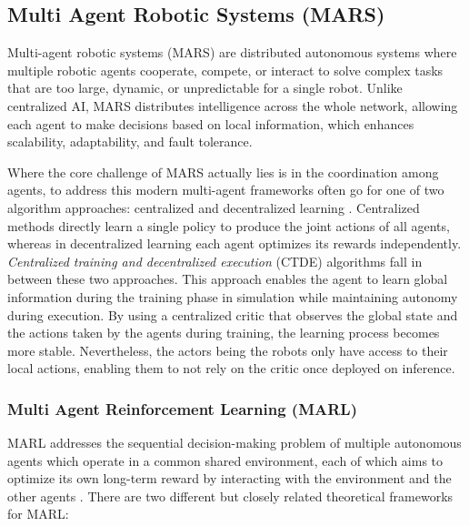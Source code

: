 \subsection{Multi Agent Robotic Systems (MARS)}
Multi-agent robotic systems (MARS) are distributed autonomous systems where multiple robotic agents cooperate, compete, or interact to solve complex tasks that are too large, dynamic, or unpredictable for a single robot.  Unlike centralized AI, MARS distributes intelligence across the whole network, allowing each agent to make decisions based on local information, which enhances scalability, adaptability, and fault tolerance.

Where the core challenge of MARS actually lies is in the coordination among agents, to address this modern multi-agent frameworks often go for one of two algorithm approaches: centralized and decentralized learning \cite{yu2022surprisingeffectivenessppocooperative}. Centralized methods directly learn a single policy to produce the joint actions of all agents, whereas in decentralized learning each agent optimizes its rewards independently. \textit{Centralized training and decentralized execution} (CTDE) algorithms fall in between these two approaches. This approach enables the agent to learn global information during the training phase in simulation while maintaining autonomy during execution. By using a centralized critic that observes the global state and the actions taken by the agents during training, the learning process becomes more stable. Nevertheless, the actors being the robots only have access to their local actions, enabling them to not rely on the critic once deployed on inference. 

\subsubsection{Multi Agent Reinforcement Learning (MARL)}
MARL addresses the sequential decision-making problem of multiple autonomous agents which operate in a common shared environment, each of which aims to optimize its own long-term reward by interacting with the environment and the other agents \cite{zhang2021multiagentreinforcementlearningselective}. There are two different but closely related theoretical frameworks for MARL:

